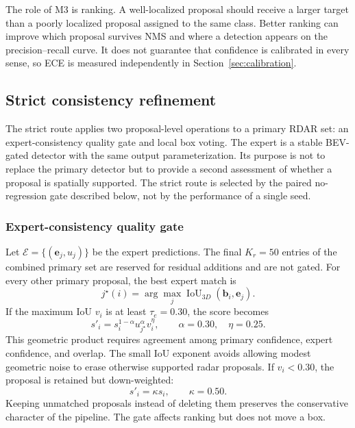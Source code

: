 \documentclass[preprint,12pt,times]{elsarticle}
\begin{document}
The role of M3 is ranking. A well-localized proposal should receive a larger
target than a poorly localized proposal assigned to the same class. Better
ranking can improve which proposal survives NMS and where a detection appears
on the precision--recall curve. It does not guarantee that confidence is
calibrated in every sense, so ECE is measured independently in
Section~\ref{sec:calibration}.

\subsection{Strict consistency refinement}

The strict route applies two proposal-level operations to a primary RDAR set:
an expert-consistency quality gate and local box voting. The expert is a
stable BEV-gated detector with the same output parameterization. Its purpose is
not to replace the primary detector but to provide a second assessment of
whether a proposal is spatially supported. The strict route is selected by the
paired no-regression gate described below, not by the performance of a single
seed.

\subsubsection{Expert-consistency quality gate}

Let $\mathcal{E}=\{(\mathbf{e}_j,u_j)\}$ be the expert predictions. The final
$K_r=50$ entries of the combined primary set are reserved for residual
additions and are not gated. For every other primary proposal, the best expert
match is
\begin{equation}
j^\star(i)=\arg\max_j
\operatorname{IoU}_{3D}(\mathbf{b}_i,\mathbf{e}_j).
\end{equation}
If the maximum IoU $v_i$ is at least $\tau_e=0.30$, the score becomes
\begin{equation}
s'_i=s_i^{1-\alpha}u_{j^\star}^{\alpha}v_i^\eta,
\qquad \alpha=0.30,\quad \eta=0.25.
\label{eq:quality-gate}
\end{equation}
This geometric product requires agreement among primary confidence, expert
confidence, and overlap. The small IoU exponent avoids allowing modest
geometric noise to erase otherwise supported radar proposals. If $v_i<0.30$,
the proposal is retained but down-weighted:
\begin{equation}
s'_i=\kappa s_i,\qquad \kappa=0.50.
\end{equation}
Keeping unmatched proposals instead of deleting them preserves the conservative
character of the pipeline. The gate affects ranking but does not move a box.
\end{document}
